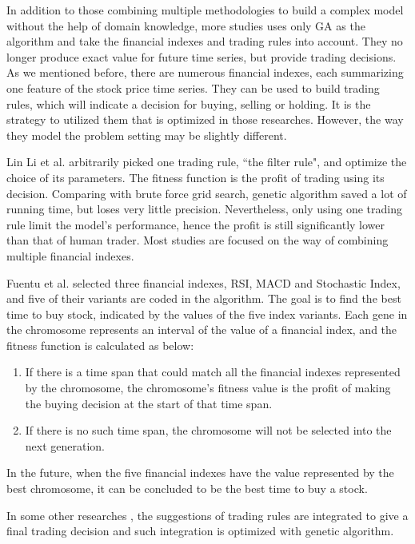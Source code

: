 \documentclass{article}
\begin{document}
In addition to those combining multiple methodologies to build a complex model
without the help of domain knowledge,
more studies uses only GA as the algorithm and take the financial indexes and trading rules into account.
They no longer produce exact value for future time series, but provide trading decisions.
As we mentioned before, there are numerous financial indexes,
each summarizing one feature of the stock price time series.
They can be used to build trading rules, which will indicate a decision for buying, selling or holding.
It is the strategy to utilized them that is optimized in those researches.
However, the way they model the problem setting may be slightly different.

Lin Li et al. \cite{the-applications-of-genetic-algorithms-in-stock-market-data-mining}
arbitrarily picked one trading rule, ``the filter rule", and optimize the choice of its parameters.
The fitness function is the profit of trading using its decision.
Comparing with brute force grid search, genetic algorithm saved a lot of running time,
but loses very little precision.
Nevertheless, only using one trading rule limit the model's performance, hence
the profit is still significantly lower than that of human trader.
Most studies are focused on the way of combining multiple financial indexes.

Fuentu et al. \cite{genetic-algorithms-to-optimise-the-time-to-make-stock-market-investment} selected
three financial indexes, RSI, MACD and Stochastic Index,
and five of their variants are coded in the algorithm.
The goal is to find the best time to buy stock, indicated by the values of the five index variants.
Each gene in the chromosome represents an interval of the value of a financial index,
and the fitness function is calculated as below:
\begin{enumerate}
\item If there is a time span that could match all the financial indexes represented by the chromosome,
	the chromosome's fitness value is the profit of making the buying decision at the start of that time span.
\item If there is no such time span, the chromosome will not be selected into the next generation.
\end{enumerate}
In the future, when the five financial indexes have the value represented by the best chromosome,
it can be concluded to be the best time to buy a stock.


In some other researches
\cite{genetic-algorithms-for-predicting-the-egyptian-stock-market}
\cite{stock-timing-using-genetic-algorithms}
, the suggestions of trading rules are integrated to give a final trading decision
and such integration is optimized with genetic algorithm.
\end{document}

